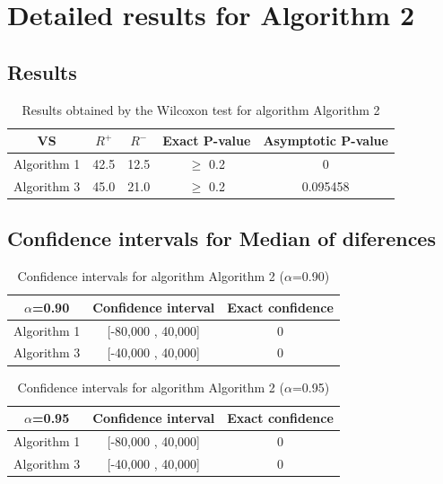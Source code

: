 \documentclass[a4paper,10pt]{article}
\begin{document}
 \clearpage 


\section{Detailed results for Algorithm 2}


\subsection{Results}

\begin{table}[!htp]
\centering\small
\begin{tabular}{
|c|c|c|c|c|}
\hline
 VS & $R^{+}$ & $R^{-}$ & Exact P-value & Asymptotic P-value \\ \hline 
Algorithm 1 & 42.5 & 12.5 & $\geq$ 0.2 & 0\\ \hline 
Algorithm 3 & 45.0 & 21.0 & $\geq$ 0.2 & 0.095458\\ \hline 

\end{tabular}
\caption{Results obtained by the Wilcoxon test for algorithm Algorithm 2}
\end{table}

\subsection{Confidence intervals for Median of diferences}

\begin{table}[!htp]
\centering\small
\begin{tabular}{
|c|c|c|}
\hline
 $\alpha$=0.90 & Confidence interval & Exact confidence \\ \hline 
Algorithm 1 & [-80,000 , 40,000] & 0\\ \hline 
Algorithm 3 & [-40,000 , 40,000] & 0\\ \hline 

\end{tabular}
\caption{Confidence intervals for algorithm Algorithm 2 ($\alpha$=0.90)}
\end{table}
\begin{table}[!htp]
\centering\small
\begin{tabular}{
|c|c|c|}
\hline
 $\alpha$=0.95 & Confidence interval & Exact confidence \\ \hline 
Algorithm 1 & [-80,000 , 40,000] & 0\\ \hline 
Algorithm 3 & [-40,000 , 40,000] & 0\\ \hline 

\end{tabular}
\caption{Confidence intervals for algorithm Algorithm 2 ($\alpha$=0.95)}
\end{table}
\end{document}
